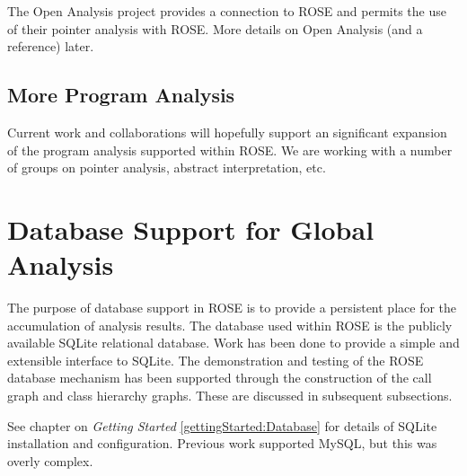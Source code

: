    The Open Analysis project provides a connection to ROSE and permits
the use of their pointer analysis with ROSE.  More details on Open Analysis
(and a reference) later.

\subsection{More Program Analysis}

   Current work and collaborations will hopefully support an significant 
expansion of the program analysis supported within ROSE.  We are working with
a number of groups on pointer analysis, abstract interpretation, etc.

\section{Database Support for Global Analysis}
\label{RoseExamples:RoseTutorial:Database}

   The purpose of database support in ROSE is to provide a persistent
place for the accumulation of analysis results.  The database used within ROSE
is the publicly available SQLite relational database.  Work has
been done to provide a simple and extensible interface to SQLite.  The 
demonstration and testing of the ROSE database mechanism has been supported 
through the construction of the call graph and class hierarchy graphs. These
are discussed in subsequent subsections.

See chapter on {\em Getting Started} \ref{gettingStarted:Database}
for details of SQLite installation and configuration.  Previous work
supported MySQL, but this was overly complex.



